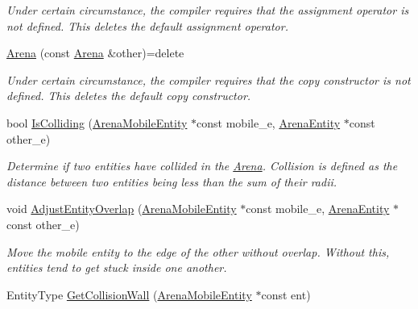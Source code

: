\begin{DoxyCompactItemize}
\begin{DoxyCompactList}\small\item\em Under certain circumstance, the compiler requires that the assignment operator is not defined. This {\ttfamily deletes} the default assignment operator. \end{DoxyCompactList}\item 
\mbox{\label{class_arena_afce6e35e1470823539dc9194bef77499}} 
\mbox{\hyperlink{class_arena_afce6e35e1470823539dc9194bef77499}{Arena}} (const \mbox{\hyperlink{class_arena}{Arena}} \&other)=delete
\begin{DoxyCompactList}\small\item\em Under certain circumstance, the compiler requires that the copy constructor is not defined. This {\ttfamily deletes} the default copy constructor. \end{DoxyCompactList}\item 
bool \mbox{\hyperlink{class_arena_ab4479b0268867602d0c4b510d5f99aff}{Is\+Colliding}} (\mbox{\hyperlink{class_arena_mobile_entity}{Arena\+Mobile\+Entity}} $\ast$const mobile\+\_\+e, \mbox{\hyperlink{class_arena_entity}{Arena\+Entity}} $\ast$const other\+\_\+e)
\begin{DoxyCompactList}\small\item\em Determine if two entities have collided in the \mbox{\hyperlink{class_arena}{Arena}}. Collision is defined as the distance between two entities being less than the sum of their radii. \end{DoxyCompactList}\item 
\mbox{\label{class_arena_a2506fab770b6070d8f061bcab4c65138}} 
void \mbox{\hyperlink{class_arena_a2506fab770b6070d8f061bcab4c65138}{Adjust\+Entity\+Overlap}} (\mbox{\hyperlink{class_arena_mobile_entity}{Arena\+Mobile\+Entity}} $\ast$const mobile\+\_\+e, \mbox{\hyperlink{class_arena_entity}{Arena\+Entity}} $\ast$const other\+\_\+e)
\begin{DoxyCompactList}\small\item\em Move the mobile entity to the edge of the other without overlap. Without this, entities tend to get stuck inside one another. \end{DoxyCompactList}\item 
Entity\+Type \mbox{\hyperlink{class_arena_a7b72cf7688ee6ab1395bf438663bc1da}{Get\+Collision\+Wall}} (\mbox{\hyperlink{class_arena_mobile_entity}{Arena\+Mobile\+Entity}} $\ast$const ent)

\end{DoxyCompactItemize}
